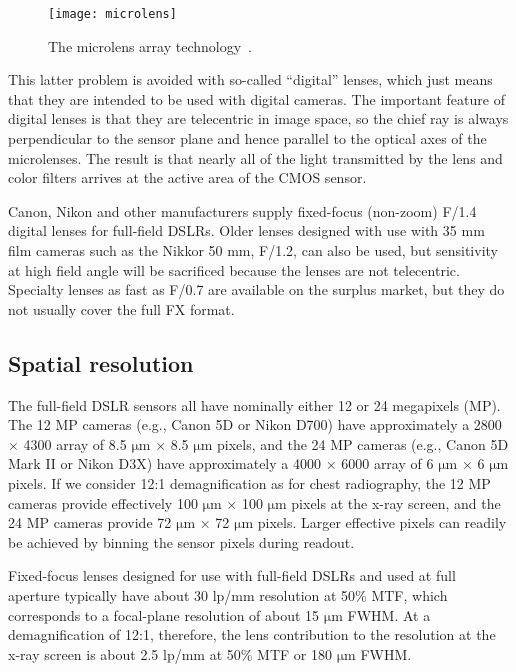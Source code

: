 \begin{figure}[h]
\centering
\texttt{[image: microlens]}
\caption{The microlens array technology~\citep{microlensfig}.}
\label{fig:microlensarray}
\end{figure}

This latter problem is avoided with so-called ``digital'' lenses, which just means that they are intended to be used with digital cameras. The important feature of digital lenses is that they are telecentric in image space, so the chief ray is always perpendicular to the sensor plane and hence parallel to the optical axes of the microlenses. The result is that nearly all of the light transmitted by the lens and color filters arrives at the active area of the CMOS sensor. 

Canon, Nikon and other manufacturers supply fixed-focus (non-zoom) F/1.4 digital lenses for full-field DSLRs. Older lenses designed with use with 35 mm film cameras such as the Nikkor 50 mm, F/1.2, can also be used, but sensitivity at high field angle will be sacrificed because the lenses are not telecentric. Specialty lenses as fast as F/0.7 are available on the surplus market, but they do not usually cover the full FX format.

\subsection{Spatial resolution}
\label{subsect:spatial_resolution}
The full-field DSLR sensors all have nominally either 12 or 24 megapixels (MP). The 12 MP cameras (e.g., Canon 5D or Nikon D700) have approximately a 2800 $\times$ 4300 array of 8.5 $\mathrm{\mu m}$ $\times$ 8.5 $\mathrm{\mu m}$ pixels, and the 24 MP cameras (e.g., Canon 5D Mark II or Nikon D3X) have approximately a 4000 $\times$ 6000 array of 6 $\mathrm{\mu m}$ $\times$ 6 $\mathrm{\mu m}$ pixels. If we consider 12:1 demagnification as for chest radiography, the 12 MP cameras provide effectively 100 $\mathrm{\mu m}$ $\times$ 100 $\mathrm{\mu m}$ pixels at the x-ray screen, and the 24 MP cameras provide 72 $\mathrm{\mu m}$ $\times$ 72 $\mathrm{\mu m}$ pixels. Larger effective pixels can readily be achieved by binning the sensor pixels during readout.

Fixed-focus lenses designed for use with full-field DSLRs and used at full aperture typically have about 30 lp/mm resolution at 50\% MTF, which corresponds to a focal-plane resolution of about 15 $\mathrm{\mu m}$ FWHM. At a demagnification of 12:1, therefore, the lens contribution to the resolution at the x-ray screen is about 2.5 lp/mm at 50\% MTF or 180 $\mathrm{\mu m}$ FWHM.

